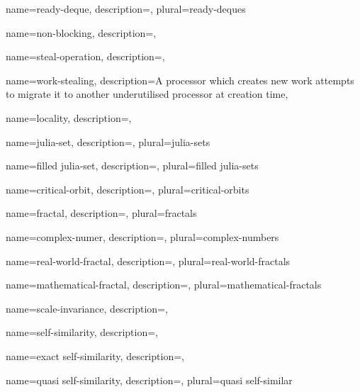 {
    name={ready-deque},
    description={},
    plural={ready-deques}
}

{
    name={non-blocking},
    description={},
}

{
    name={steal-operation},
    description={},
}

{
    name={work-stealing},
    description={A processor which creates new work attempts to migrate it to 
                 another underutilised processor at creation time},
}

{
    name={locality},
    description={},
}

{
    name={julia-set},
    description={},
    plural={julia-sets}
}

{
    name={filled julia-set},
    description={},
    plural={filled julia-sets}
}

{
    name={critical-orbit},
    description={},
    plural={critical-orbits}
}

{
    name={fractal},
    description={},
    plural={fractals}
}

{
    name={complex-numer},
    description={},
    plural={complex-numbers}
}

{
    name={real-world-fractal},
    description={},
    plural={real-world-fractals}
}

{
    name={mathematical-fractal},
    description={},
    plural={mathematical-fractals}
}

{
    name={scale-invariance},
    description={},
}

{
    name={self-similarity},
    description={},
}

{
    name={exact self-similarity},
    description={},
}

{
    name={quasi self-similarity},
    description={},
    plural={quasi self-similar}
}
